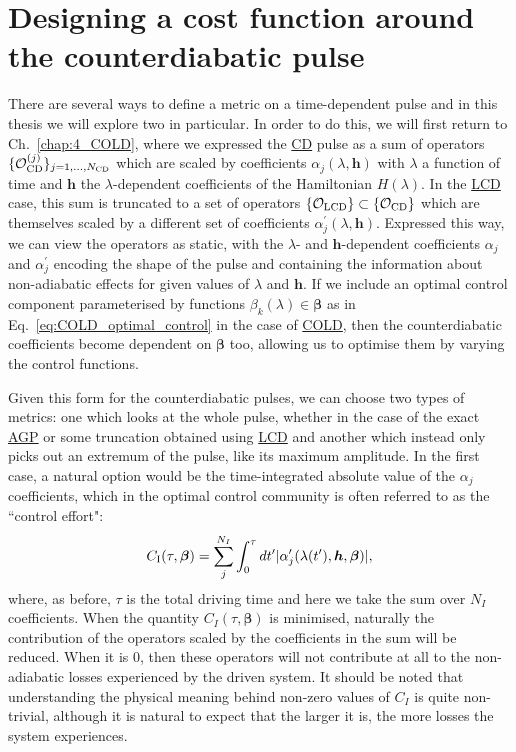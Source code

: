 \documentclass[a4paper,oneside,11pt]{book}
\newcommand{\betabb}{\boldsymbol{\beta}}
\newcommand{\hbb}{\boldsymbol{h}}
\newcommand{\acrref}[1]{\hyperref[acr:#1]{#1}}
\begin{document}
\section{Designing a cost function around the counterdiabatic pulse}\label{sec:5.2_designing_costfunc_hocd}

There are several ways to define a metric on a time-dependent pulse and in this thesis we will explore two in particular. In order to do this, we will first return to Ch.~\ref{chap:4_COLD}, where we expressed the \acrref{CD} pulse as a sum of operators $\{\mathcal{O}_{\rm CD}^{(j)}\}_{j = 1, ..., N_{\rm CD}}$ which are scaled by coefficients $\alpha_j(\lambda, \hbb)$ with $\lambda$ a function of time and $\hbb$ the $\lambda$-dependent coefficients of the Hamiltonian $H(\lambda)$. In the \acrref{LCD} case, this sum is truncated to a set of operators $\{\mathcal{O}_{\rm LCD}\} \subset \{\mathcal{O}_{\rm CD}\}$ which are themselves scaled by a different set of coefficients $\alpha_j^{\prime}(\lambda, \hbb)$. Expressed this way, we can view the operators as static, with the $\lambda$- and $\hbb$-dependent coefficients $\alpha_j$ and $\alpha_j^{\prime}$ encoding the shape of the pulse and containing the information about non-adiabatic effects for given values of $\lambda$ and $\hbb$. If we include an optimal control component parameterised by functions $\beta_k(\lambda) \in \betabb$ as in Eq.~\eqref{eq:COLD_optimal_control} in the case of \acrref{COLD}, then the counterdiabatic coefficients become dependent on $\betabb$ too, allowing us to optimise them by varying the control functions.

Given this form for the counterdiabatic pulses, we can choose two types of metrics: one which looks at the whole pulse, whether in the case of the exact \acrref{AGP} or some truncation obtained using \acrref{LCD} and another which instead only picks out an extremum of the pulse, like its maximum amplitude. In the first case, a natural option would be the time-integrated absolute value of the $\alpha_j$ coefficients, which in the optimal control community is often referred to as the ``control effort"\cite{petersen_control_1987}:
\begin{equation}\label{eq:COLD_costfunc_integral}
    C_{\rm I}(\tau, \betabb) = \sum_j^{N_I} \int_{0}^{\tau} dt^{\prime} |\alpha_j^{\prime}(\lambda(t^{\prime}), \hbb, \betabb)|,
\end{equation}
where, as before, $\tau$ is the total driving time and here we take the sum over $N_I$ coefficients. When the quantity $C_I(\tau, \betabb)$ is minimised, naturally the contribution of the operators scaled by the coefficients in the sum will be reduced. When it is $0$, then these operators will not contribute at all to the non-adiabatic losses experienced by the driven system. It should be noted that understanding the physical meaning behind non-zero values of $C_I$ is quite non-trivial, although it is natural to expect that the larger it is, the more losses the system experiences. 
\end{document}

